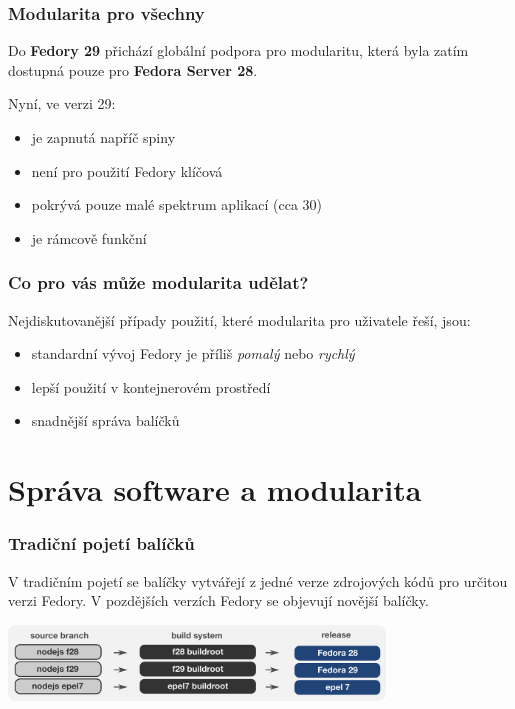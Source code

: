 \documentclass[12pt]{beamer}
\begin{document}
\begin{frame}
\frametitle{Modularita pro všechny}
Do \textbf{Fedory 29} přichází globální podpora pro modularitu, která byla zatím dostupná pouze pro \textbf{Fedora Server 28}. 

Nyní, ve verzi 29:

\vspace{5pt}

\begin{itemize}
	\item je zapnutá napříč spiny
	\item není pro použití Fedory klíčová
	\item pokrývá pouze malé spektrum aplikací (cca 30)
	\item je rámcově funkční
\end{itemize}	
\end{frame}

\begin{frame}
\frametitle{Co pro vás může modularita udělat?}
Nejdiskutovanější případy použití, které modularita pro uživatele řeší, jsou:

\vspace{5pt}

\begin{itemize}
	\item standardní vývoj Fedory je příliš \textit{pomalý} nebo \textit{rychlý}
	\item lepší použití v kontejnerovém prostředí
	\item snadnější správa balíčků
\end{itemize}
\end{frame}

\section{Správa software a modularita}

\begin{frame}
\frametitle{Tradiční pojetí balíčků}
V tradičním pojetí se balíčky vytvářejí z jedné verze zdrojových kódů pro určitou verzi Fedory. V pozdějších verzích Fedory se objevují novější balíčky.
\begin{center}
	\includegraphics[width=10cm]{traditional}
\end{center}
\end{frame}
\end{document}

